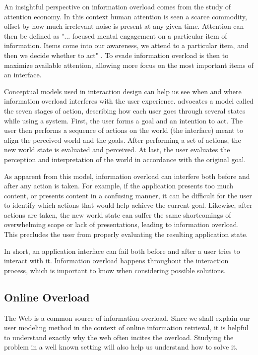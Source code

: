 An insightful perspective on information overload comes from the study of attention economy. 
In this context human attention is seen a scarce commodity, offset by how much irrelevant noise is present at any given time. 
Attention can then be defined as "... focused mental engagement on a particular item of information. 
Items come into our awareness, we attend to a particular item, and then we decide whether to act" 
\citep{Davenport2001}. 
To evade information overload is then to maximize available attention, allowing more focus on the most important items of an interface.

Conceptual models used in interaction design can help us see when and where information overload interferes with the user experience. 
\cite{Norman1988} advocates a model called the seven stages of action, describing how each user goes through several states while using a system. 
First, the user forms a goal and an intention to act. The user then performs a sequence of actions on the world (the interface)
 meant to align the perceived world and the goals. After performing a set of actions, the new world state is evaluated and perceived. 
At last, the user evaluates the perception and interpretation of the world in accordance with the original goal.

As apparent from this model, information overload can interfere both before and after any action is taken. 
For example, if the application presents too much content, or presents content in a confusing manner, 
it can be difficult for the user to identify which actions that would help achieve the current goal. 
Likewise, after actions are taken, the new world state can suffer the same shortcomings of overwhelming scope or lack of presentations, 
leading to information overload. 
This precludes the user from properly evaluating the resulting application state. 

In short, an application interface can fail both before and after a user tries to interact with it.
Information overload happens throughout the interaction process, which is important to know when considering possible solutions.

\subsection{Online Overload}

The Web is a common source of information overload. Since we shall explain our user modeling method in the context of 
online information retrieval, it is helpful to understand exactly why the web often incites the overload. 
Studying the problem in a well known setting will also help us understand how to solve it.

